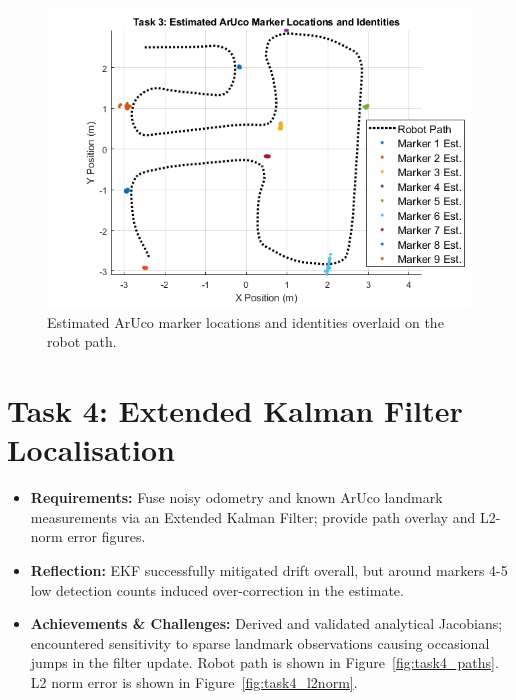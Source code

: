 \documentclass[conference]{IEEEtran}
\begin{document}
\begin{figure}[ht]
  \centering
  \includegraphics[width=\linewidth]{images/task3_aruco_marker_map.png}
  \caption{Estimated ArUco marker locations and identities overlaid on the robot path.}
  \label{fig:task3_aruco_marker_map}
\end{figure}

\section{Task 4: Extended Kalman Filter Localisation} 
\begin{itemize}
  \item \textbf{Requirements:} Fuse noisy odometry and known ArUco landmark measurements via an Extended Kalman Filter; provide path overlay and L2-norm error figures.
  \item \textbf{Reflection:} EKF successfully mitigated drift overall, but around markers 4-5 low detection counts induced over-correction in the estimate.
  \item \textbf{Achievements \& Challenges:} Derived and validated analytical Jacobians; encountered sensitivity to sparse landmark observations causing occasional jumps in the filter update. Robot path is shown in Figure~\ref{fig:task4_paths}. L2 norm error is shown in Figure~\ref{fig:task4_l2norm}.
\end{itemize}
\end{document}
